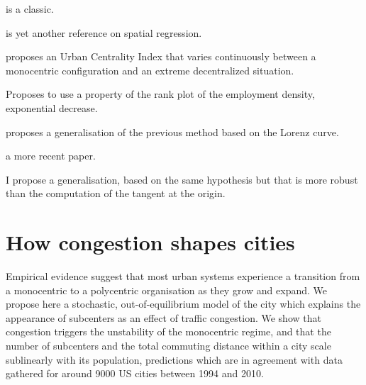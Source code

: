 \cite{Tsai:2005} is a classic.

\cite{Griffith:2007} is yet another reference on spatial regression.

\cite{Pereira:2013} proposes an Urban Centrality Index that varies continuously
between a monocentric configuration and an extreme decentralized situation.

\cite{Louf:2013_polycentric} Proposes to use a property of the rank plot of the
employment density, exponential decrease.

\cite{Louail:2014} proposes a generalisation of the previous method based on the
Lorenz curve.

\cite{LeNechet:2015} a more recent paper.

I propose a generalisation, based on the same hypothesis but that is more robust
than the computation of the tangent at the origin.

\section{How congestion shapes cities}
\label{sec:how_congestion_shapes_cities}

Empirical evidence suggest that most urban systems experience a
transition from a monocentric to a polycentric organisation as they
grow and expand. We propose here a stochastic, out-of-equilibrium model of the
city which explains the appearance of subcenters as an effect of
traffic congestion. We show that congestion triggers the unstability
of the monocentric regime, and that the number of subcenters and the
total commuting distance within a city scale sublinearly with its
population, predictions which are in agreement with data gathered for
around 9000 US cities between 1994 and 2010.\\



